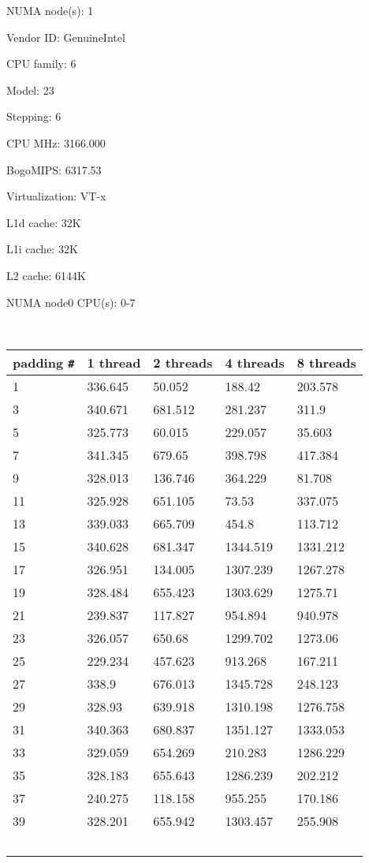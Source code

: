 \documentclass[letterpaper,10pt]{article} %
\begin{document}
NUMA node(s):          1

Vendor ID:             GenuineIntel

CPU family:            6

Model:                 23

Stepping:              6

CPU MHz:               3166.000

BogoMIPS:              6317.53

Virtualization:        VT-x

L1d cache:             32K

L1i cache:             32K

L2 cache:              6144K

NUMA node0 CPU(s):     0-7


\begin{figure} [ht]
	\centering
	
	\label{runtimes}
\end{figure}

\begin{table}  [ht]
	\centering
	    \begin{tabular}{lllll}
		padding \verb|#| & 1 thread & 2 threads & 4 threads & 8 threads\\ \hline
			 1 & 336.645 & 50.052 & 188.42 & 203.578\\ 
			 3 & 340.671 & 681.512 & 281.237 & 311.9\\ 
			 5 & 325.773 & 60.015 & 229.057 & 35.603\\ 
			 7 & 341.345 & 679.65 & 398.798 & 417.384\\ 
			 9 & 328.013 & 136.746 & 364.229 & 81.708\\ 
			11 & 325.928 & 651.105 & 73.53 & 337.075\\ 
			13 & 339.033 & 665.709 & 454.8 & 113.712\\ 
			15 & 340.628 & 681.347 & 1344.519 & 1331.212\\ 
			17 & 326.951 & 134.005 & 1307.239 & 1267.278\\ 
			19 & 328.484 & 655.423 & 1303.629 & 1275.71\\ 
			21 & 239.837 & 117.827 & 954.894 & 940.978\\ 
			23 & 326.057 & 650.68 & 1299.702 & 1273.06\\ 
			25 & 229.234 & 457.623 & 913.268 & 167.211\\ 
			27 & 338.9 & 676.013 & 1345.728 & 248.123\\ 
			29 & 328.93 & 639.918 & 1310.198 & 1276.758\\ 
			31 & 340.363 & 680.837 & 1351.127 & 1333.053\\ 
			33 & 329.059 & 654.269 & 210.283 & 1286.229\\ 
			35 & 328.183 & 655.643 & 1286.239 & 202.212\\ 
			37 & 240.275 & 118.158 & 955.255 & 170.186\\ 
			39 & 328.201 & 655.942 & 1303.457 & 255.908\\ 
		    \end{tabular}
	\end{table}

	
\end{document}
